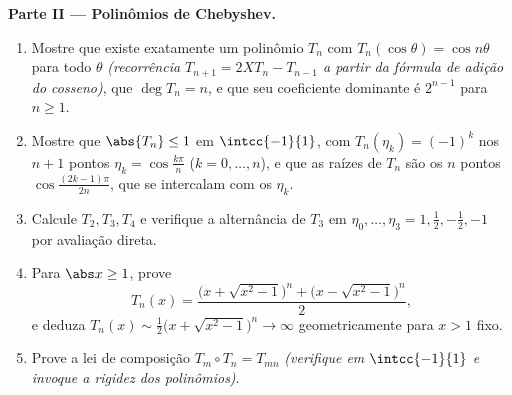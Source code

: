 \begin{problem}
\medskip
\noindent\textbf{Parte II --- Polinômios de Chebyshev.}
\begin{enumerate}[resume]
  \item Mostre que existe exatamente um polinômio $T_n$ com
        $T_n(\cos\theta) = \cos n\theta$ para todo $\theta$
        \emph{(recorrência $T_{n+1} = 2XT_n - T_{n-1}$ a partir da
        fórmula de adição do cosseno)}, que $\deg T_n = n$, e que
        seu coeficiente dominante é $2^{n-1}$ para $n \geq 1$.
  \item Mostre que $\abs{T_n} \leq 1$ em $\intcc{-1}{1}$, com
        $T_n(\eta_k) = (-1)^k$ nos $n + 1$ pontos $\eta_k =
        \cos\frac{k\pi}{n}$ ($k = 0, \dots, n$), e que as
        raízes de $T_n$ são os $n$ pontos
        $\cos\frac{(2k-1)\pi}{2n}$, que se intercalam com os $\eta_k$.
  \item Calcule $T_2, T_3, T_4$ e verifique a alternância de
        $T_3$ em $\eta_0, \dots, \eta_3 = 1, \frac12, -\frac12,
        -1$ por avaliação direta.
  \item Para $\abs x \geq 1$, prove
        \[
        T_n(x) = \frac{\bigl(x + \sqrt{x^2 - 1}\bigr)^n +
        \bigl(x - \sqrt{x^2 - 1}\bigr)^n}{2},
        \]
        e deduza $T_n(x) \sim \frac12\bigl(x + \sqrt{x^2 -
        1}\bigr)^n \to \infty$ geometricamente para $x > 1$ fixo.
  \item Prove a lei de composição $T_m \circ T_n = T_{mn}$
        \emph{(verifique em $\intcc{-1}{1}$ e invoque a rigidez
        dos polinômios)}.
\end{enumerate}


\end{problem}
